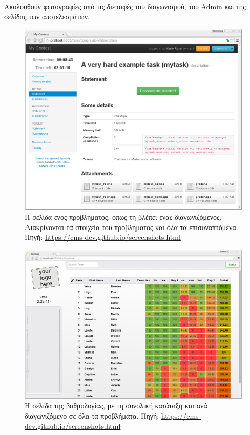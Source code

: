 \documentclass[diploma]{softlab-thesis}
\begin{document}
\bigskip

Ακολουθούν φωτογραφίες από τις διεπαφές του διαγωνισμού, του Admin και της σελίδας
των αποτελεσμάτων.

\bigskip

\begin{figure}
  \centering
  \includegraphics[scale=0.4,trim=4 4 4 4,clip]{Figures/cmscontestant.png}
  \caption[Σελίδα προβλήματος CMS]{Η σελίδα ενός προβλήματος, όπως τη βλέπει ένας
  διαγωνιζόμενος. Διακρίνονται τα στοιχεία του προβλήματος και όλα τα
  επισυναπτόμενα. Πηγή: \url{https://cms-dev.github.io/screenshots.html}}
\end{figure}

\begin{figure}
  \centering
  \includegraphics[scale=0.3,trim=4 4 4 4,clip]{Figures/cmsranking.png}
  \caption[Σελίδα βαθμολογιών CMS]{Η σελίδα της βαθμολογίας, με τη συνολική κατάταξη
  και ανά διαγωνιζόμενο σε όλα τα προβλήματα. Πηγή: \url{https://cms-dev.github.io/screenshots.html}}
\end{figure}
\end{document}
